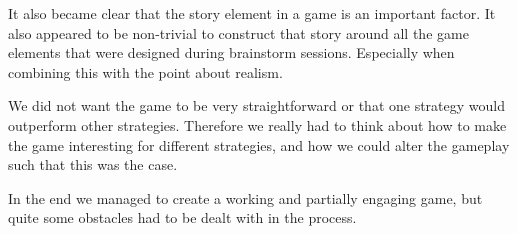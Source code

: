 \documentclass[11pt,a4paper]{article}
\begin{document}
It also became clear that the story element in a game is an important factor. It also appeared to be non-trivial to construct that story around all the game elements that were designed during brainstorm sessions. Especially when combining this with the point about realism.

We did not want the game to be very straightforward or that one strategy would outperform other strategies. Therefore we really had to think about how to make the game interesting for different strategies, and how we could alter the gameplay such that this was the case.

In the end we managed to create a working and partially engaging game, but quite some obstacles had to be dealt with in the process.
\end{document}
